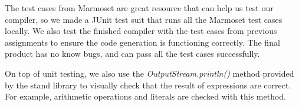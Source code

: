 \documentclass[a4paper, notitlepage]{report}
\begin{document}
The test cases from Marmoset are great resource that can help us test our compiler, so we made a JUnit test suit that runs all the Marmoset test cases locally. We also test the finished compiler with the test cases from previous assignments to ensure the code generation is functioning correctly. The final product has no know bugs, and can pass all the test cases successfully.

On top of unit testing, we also use the \emph{OutputStream.println()} method provided by the stand library to visually check that the result of expressions are correct. For example, arithmetic operations and literals are checked with this method.














%
%
\end{document}
